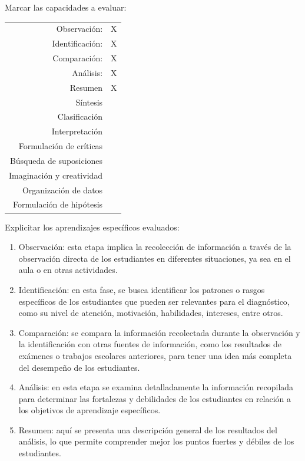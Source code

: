 \documentclass[a4paper,12pt]{book}
\begin{document}
Marcar las capacidades a evaluar: 
\begin{table}[h!]
    \centering 
    \begin{tabular}{|r|c|} \hline
Observación: & X \\ 
Identificación:& X\\
Comparación:  & X\\
Análisis:  & X\\                                          Resumen   & X\\                                          Síntesis  & \\                                        Clasificación  & \\                               Interpretación  & \\
Formulación de críticas & \\
Búsqueda de suposiciones  & \\     
Imaginación y creatividad & \\
Organización de datos & \\
Formulación de hipótesis & \\ \hline
    \end{tabular}
\end{table} 
Explicitar los aprendizajes específicos evaluados:
\begin{enumerate}

\item Observación: esta etapa implica la recolección de información a través de la observación directa de los estudiantes en diferentes situaciones, ya sea en el aula o en otras actividades.

\item Identificación: en esta fase, se busca identificar los patrones o rasgos específicos de los estudiantes que pueden ser relevantes para el diagnóstico, como su nivel de atención, motivación, habilidades, intereses, entre otros.

\item Comparación: se compara la información recolectada durante la observación y la identificación con otras fuentes de información, como los resultados de exámenes o trabajos escolares anteriores, para tener una idea más completa del desempeño de los estudiantes.

\item Análisis: en esta etapa se examina detalladamente la información recopilada para determinar las fortalezas y debilidades de los estudiantes en relación a los objetivos de aprendizaje específicos.

\item Resumen: aquí se presenta una descripción general de los resultados del análisis, lo que permite comprender mejor los puntos fuertes y débiles de los estudiantes.


\end{enumerate}
\end{document}
